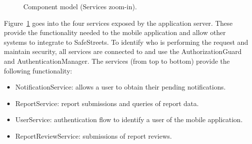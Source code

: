 \begin{figure}[H]
    \centering
    \caption{\label{fig:component-services-zoom}Component model (Services zoom-in).}
\end{figure}

Figure~\ref{fig:component-services-zoom} goes into the four services exposed by the application server. These provide the functionality needed to the mobile application and allow other systems to integrate to SafeStreets.
To identify who is performing the request and maintain security, all services are connected to and use the AuthorizationGuard and AuthenticationManager.
The services (from top to bottom) provide the following functionality:
\begin{itemize}
    \item NotificationService: allows a user to obtain their pending notifications.
    \item ReportService: report submissions and queries of report data.
    \item UserService: authentication flow to identify a user of the mobile application.
    \item ReportReviewService: submissions of report reviews.
\end{itemize}


